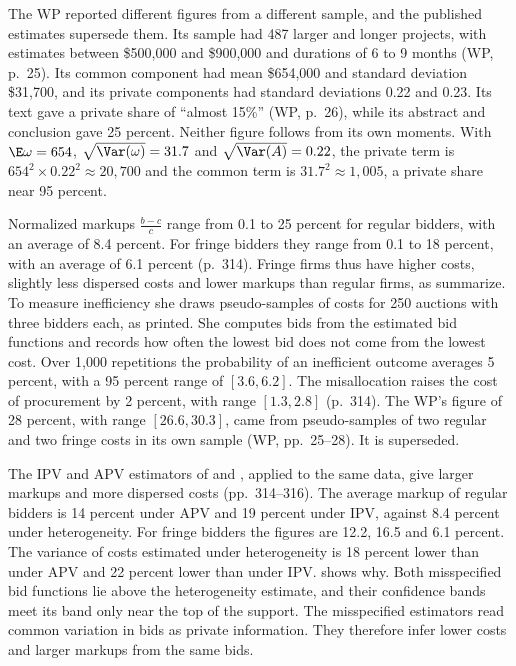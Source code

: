 The WP reported different figures from a different sample, and the published estimates supersede
them. Its sample had 487 larger and longer projects, with estimates between \$500,000 and \$900,000
and durations of 6 to 9 months (WP, p.~25). Its common component had mean \$654,000 and standard
deviation \$31,700, and its private components had standard deviations 0.22 and 0.23. Its text gave a
private share of ``almost 15\%'' (WP, p.~26), while its abstract and conclusion gave 25 percent.
Neither figure follows from its own moments. With $\E\omega=654$, $\sqrt{\Var(\omega)}=31.7$ and
$\sqrt{\Var(A)}=0.22$, the private term is $654^2\times0.22^2\approx20{,}700$ and the common term is
$31.7^2\approx1{,}005$, a private share near 95 percent.

Normalized markups $\frac{b-c}{c}$ range from 0.1 to 25 percent for regular bidders, with an average
of 8.4 percent. For fringe bidders they range from 0.1 to 18 percent, with an average of 6.1 percent
(p.~314). Fringe firms thus have higher costs, slightly less dispersed costs and lower markups than
regular firms, as \citet[p.~103]{HortacsuPerrigne2021} summarize. To measure inefficiency she draws
pseudo-samples of costs for 250 auctions with three bidders each, as printed. She computes bids from
the estimated bid functions and records how often the lowest bid does not come from the lowest cost.
Over 1,000 repetitions the probability of an inefficient outcome averages 5 percent, with a 95 percent
range of $[3.6,6.2]$. The misallocation raises the cost of procurement by 2 percent, with range
$[1.3,2.8]$ (p.~314). The WP's figure of 28 percent, with range $[26.6,30.3]$, came from pseudo-samples
of two regular and two fringe costs in its own sample (WP, pp.~25--28). It is superseded.

The IPV and APV estimators of \citet{GuerrePerrigneVuong2000} and \citet{LiPerrigneVuong2002},
applied to the same data, give larger markups and more dispersed costs (pp.~314--316). The average
markup of regular bidders is 14 percent under APV and 19 percent under IPV, against 8.4 percent under
heterogeneity. For fringe bidders the figures are 12.2, 16.5 and 6.1 percent. The variance of costs
estimated under heterogeneity is 18 percent lower than under APV and 22 percent lower than under IPV.
 shows why. Both misspecified bid functions lie above the heterogeneity
estimate, and their confidence bands meet its band only near the top of the support. The misspecified
estimators read common variation in bids as private information. They therefore infer lower costs and
larger markups from the same bids.

